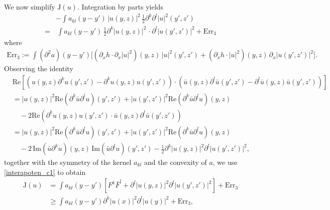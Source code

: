 \documentclass[11pt,letterpaper,reqno]{amsart}
\numberwithin{equation}{section}
\theoremstyle{definition}
\theoremstyle{remark}
\newcommand{\pa}{\partial}
\begin{document}
We now simplify \(\mathrm{J}(u)\). Integration by parts yields
\begin{align} \label{interapoten_c1}
	&-\int a_{kl}(y-y')\, |u(y,z)|^2 \,     \frac{1}{2}\pa^k \pa^l|u|^2 (y',z') \nonumber\\
	 =&\,\int a_{kl}(y-y')\,   \frac{1}{2}\pa^k|u(y,z)|^2\, \cdot \pa^l|u(y',z')|^2+\text{Err}_3
\end{align}
where
\begin{align*}
   \text{Err}_3:=  \int (\pa^2 a)(y-y')\big[ (\pa_x h  \cdot \pa_x|u|^2 )(y,z)\, |u|^2 (y',z')  + (\pa_x h \cdot |u|^2 )(y,z)\, \pa_x|u(y',z')|^2 \big].\nonumber
\end{align*}
Observing the identity
 \begin{align}
	&\mathrm{Re}[( u(y,z) \pa^k u(y',z')-\pa^k u(y,z) u(y',z'))\cdot ( \bar{u}(y,z) \pa^l \bar{u}(y',z')-\pa^l \bar{u}(y,z) \bar{u}(y',z'))]\nonumber\\
	& = |u(y,z)|^2\mathrm{Re}(\pa^k \bar{u} \pa^l u)(y',z') +|u(y',z')|^2\mathrm{Re}(\pa^k \bar{u} \pa^l u)(y,z)\nonumber\\
	&\quad -2  \mathrm{Re}(\pa^k u(y,z) u(y',z') \cdot \bar{u}(y,z) \pa^l \bar{u}(y',z') )\nonumber\\
	& =|u(y,z)|^2\mathrm{Re}(\pa^k \bar{u} \pa^l u)(y',z') +|u(y',z')|^2\mathrm{Re}(\pa^k \bar{u} \pa^l u)(y,z) \nonumber\\
	&\quad-2\,\mathrm{Im}(\bar{u} \pa^k u)(y,z)\, \mathrm{Im}(\bar{u} \pa^l u)(y',z') - \frac{1}{2}\pa^k|u(y,z)|^2 \pa^l|u(y',z')|^2 \nonumber,
 \end{align}
together with the symmetry of the kernel $a_{kl}$ and the convexity of $a$, we use \eqref{interapoten_c1} to obtain
\begin{align} \label{interapoten_t2}
	  \mathrm{J}(u) &= \int a_{kl }(y-y')[F^k \bar{F}^l + \pa^l|u(y,z)|^2 \pa^l|u(y',z')|^2 ] + \text{Err}_3\\
	&\ge  \int a_{kl }(y-y') \pa^k|u(x)|^2 \pa^l|u(y)|^2  + \text{Err}_3,\nonumber
\end{align}
\end{document}
